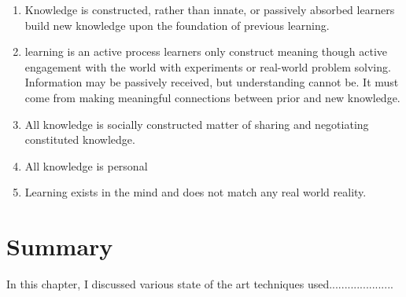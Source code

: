 \begin{enumerate}
\item Knowledge is constructed, rather than innate, or passively absorbed 
    learners build new knowledge upon the foundation of previous learning.
\item learning is an active process
    learners only construct meaning though active engagement with the world with
    experiments or real-world problem solving.
    Information may be passively received, but understanding cannot be.
    It must come from making meaningful connections between prior and new knowledge.
\item All knowledge is socially constructed
    matter of sharing and negotiating constituted knowledge.
\item All knowledge is personal
\item Learning exists in the mind and does not match any real world reality.

\end{enumerate}



\section{Summary}

In this chapter, I discussed various state of the art techniques used.....................
